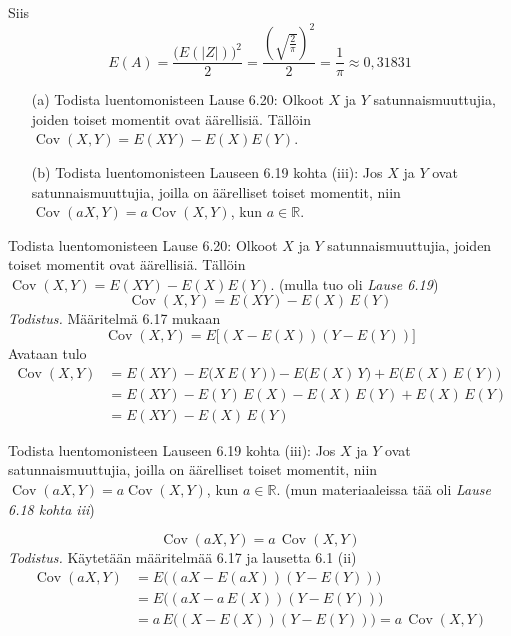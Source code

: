 \documentclass[12pt,a4paper]{article}
\begin{document}
Siis
\[
E(A)
=\frac{\bigl(E(|Z|)\bigr)^2}2
=\frac{\left(\sqrt{\frac{2}{\pi}}\right)^{2}}2
=\frac{1}{\pi}\approx 0{,}31831
\]






\pagebreak
{}
\begin{enumerate}
    \item [(a)] Todista luentomonisteen Lause 6.20: Olkoot $X$ ja $Y$ satunnaismuuttujia, joiden toiset momentit ovat äärellisiä. Tällöin
$\operatorname{Cov}(X,Y)=E(XY)-E(X)E(Y)$.
    \item[(b)] Todista luentomonisteen Lauseen 6.19 kohta (iii): Jos $X$ ja $Y$ ovat 
satunnaismuuttujia, joilla on äärelliset toiset momentit, niin
$\operatorname{Cov}(aX,Y)=a\operatorname{Cov}(X,Y)$, kun $a \in \mathbb{R}$.
\end{enumerate}


\begin{kohta}
  \item Todista luentomonisteen Lause 6.20: Olkoot $X$ ja $Y$ satunnaismuuttujia, joiden toiset momentit ovat äärellisiä. Tällöin
$\operatorname{Cov}(X,Y)=E(XY)-E(X)E(Y)$. (mulla tuo oli \emph{Lause 6.19})
  \[
    \operatorname{Cov}(X,Y)=E(XY)-E(X)\,E(Y)
  \]
  \textit{Todistus.} Määritelmä 6.17 mukaan
  \[
    \operatorname{Cov}(X,Y)=E\big[(X-E(X))(Y-E(Y))\big]
  \]
  Avataan tulo
  \[
  \begin{aligned}
    \operatorname{Cov}(X,Y)
    &= E(XY) - E\!\big(X\,E(Y)\big) - E\!\big(E(X)\,Y\big) + E\!\big(E(X)\,E(Y)\big)\\
    &= E(XY) - E(Y)\,E(X) - E(X)\,E(Y) + E(X)\,E(Y)\\
    &= E(XY) - E(X)\,E(Y)
  \end{aligned}
  \]

  \item Todista luentomonisteen Lauseen 6.19 kohta (iii): Jos $X$ ja $Y$ ovat 
satunnaismuuttujia, joilla on äärelliset toiset momentit, niin
$\operatorname{Cov}(aX,Y)=a\operatorname{Cov}(X,Y)$, kun $a \in \mathbb{R}$.
(mun materiaaleissa tää oli \linebreak\emph{Lause 6.18 kohta iii})
  
  \[
    \operatorname{Cov}(aX,Y)=a\,\operatorname{Cov}(X,Y)
  \]
  \textit{Todistus.} Käytetään määritelmää 6.17 ja lausetta 6.1 (ii)
  \[
  \begin{aligned}
    \operatorname{Cov}(aX,Y)
    &= E\big((aX-E(aX))(Y-E(Y))\big)\\
    &= E\big((aX-a\,E(X))(Y-E(Y))\big)\\
    &= a\,E\big((X-E(X))(Y-E(Y))\big)
     = a\,\operatorname{Cov}(X,Y)
  \end{aligned}
  \]
\end{kohta}
\end{document}
